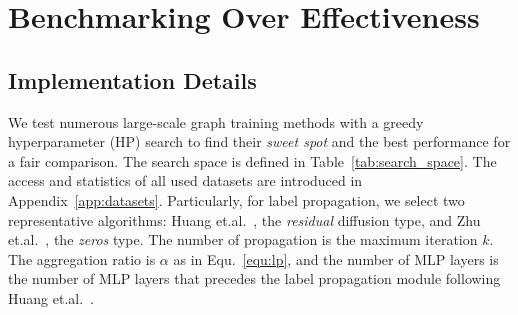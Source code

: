 \message{ !name(main.tex)}\documentclass{article}
\begin{document}
\vspace{-3mm}
\section{Benchmarking Over Effectiveness}\label{sec:benchmarking_effectiveness}
\vspace{-1mm}
\subsection{Implementation Details}
\vspace{-1mm}
We test numerous large-scale graph training methods with a greedy hyperparameter (HP) search to find their \textit{sweet spot} and the best performance for a fair comparison. The search space is defined in Table~\ref{tab:search_space}. The access and statistics of all used datasets are introduced in Appendix~\ref{app:datasets}. Particularly, for label propagation, we select two representative algorithms: Huang et.al.~\citep{huang2020combining}, the \textit{residual} diffusion type, and Zhu et.al.~\citep{zhu2005semi}, the \textit{zeros} type. The number of propagation is the maximum iteration $k$. The aggregation ratio is $\alpha$ as in Equ.~\eqref{equ:lp}, and the number of MLP layers is the number of MLP layers that precedes the label propagation module following Huang et.al.~\citep{huang2020combining}.
\end{document}
